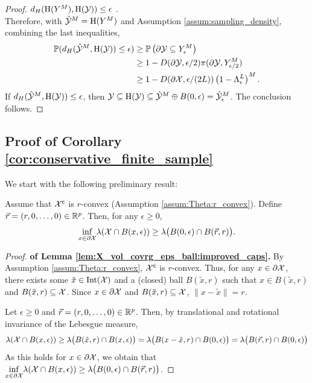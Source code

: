 \documentclass[12pt]{l4dc2022} %
\begin{document}
\begin{proof}
$d_H(
\textrm{H}(Y^M), 
\textrm{H}(\mathcal{Y})
)\leq \epsilon
$  
.
% 
\\
Therefore, with $\hat{\mathcal{Y}}^M=\textrm{H}(Y^M)$ and Assumption \ref{assum:sampling_density}, combining the last inequalities,
\begin{align*}
\mathbb{P}(
d_H(
\hat{\mathcal{Y}}^M, 
\textrm{H}(\mathcal{Y})
)\leq \epsilon
)
&\geq 
\mathbb{P}\left(\partial\mathcal{Y}\subseteq Y_\epsilon^M\right)
\\
&\geq 
1 - D(\partial\mathcal{Y},\epsilon/2)
\pi(\partial\mathcal{Y},Y_{\epsilon/2}^M)
\\
&\geq
1 - D(\partial\mathcal{X},\epsilon/(2L))
\left(1 -
	\Lambda_{\epsilon}^{L}
\right)^M.
\end{align*}
% 
% 
% 
% 
% 
% 
% 
% 
% 
% 
% 
% 
% 
% 
% 
% 
% 
% 
% 
% 
If $d_H(
\hat{\mathcal{Y}}^M, 
\textrm{H}(\mathcal{Y})
)\leq \epsilon$, 
then 
$\mathcal{Y}\subseteq\textrm{H}(\mathcal{Y})\subseteq \hat{\mathcal{Y}}^M\oplus B(0,\epsilon)=\hat{\mathcal{Y}}_\epsilon^M$. 
The conclusion follows.
\end{proof}



\subsection{Proof of Corollary \ref{cor:conservative_finite_sample}}\label{apdx:proof:cor:conservative_finite_sample}



We start with the following preliminary result:


% 
% 
% 
% 
% 
% 
% 
% 
% 
% 
\begin{lemma}%
\label{lem:X_vol_covrg_eps_ball:improved_caps}
Assume that $\mathcal{X}^{\mathsf{c}}$ is $r$-convex  (Assumption \ref{assum:Theta:r_convex}).
% 
Define 
$\vec{r}=(r,0,\dots,0)\in\mathbb{R}^p$. 
Then, for any $\epsilon\geq 0$,  
$$\underset{x\in\partial\mathcal{X}}{\inf}\lambda(\mathcal{X} \cap B(x,\epsilon))
\geq 
\lambda\big(
B(0,\epsilon) 
\cap B(\vec{r},r)
\big)
.$$
\end{lemma}



\begin{proof}\textbf{of Lemma \ref{lem:X_vol_covrg_eps_ball:improved_caps}.}
By Assumption \ref{assum:Theta:r_convex}, $\mathcal{X}^{\mathsf{c}}$ is $r$-convex. Thus, 
 for any $x\in\partial\mathcal{X}$, there exists some $\tilde{x}\in\textrm{Int}(\mathcal{X})$ and a (closed) ball $B(\tilde{x},r)$ such that $x\in B(\tilde{x},r)$ and $B(\tilde{x},r)\subseteq\mathcal{X}$. 
 Since $x\in\partial\mathcal{X}$ and $B(\tilde{x},r)\subseteq\mathcal{X}$, 
 $\|x-\tilde{x}\|=r$. %

Let $\epsilon\geq 0$ and $\vec{r}=(r,0,\dots,0)\in\mathbb{R}^p$. Then, by translational and rotational invariance of the Lebesgue measure,
$$
 \lambda(\mathcal{X} \cap B(x,\epsilon))
\geq 
\lambda\big(
B(\tilde{x},r) 
\cap 
B(x,\epsilon)
\big)
=
\lambda\big(
B(x-\tilde{x},r) 
\cap 
B(0,\epsilon)
\big)
=
\lambda\big(
B(\vec{r},r) 
\cap 
B(0,\epsilon)
\big)
$$
As this holds for $x\in\partial\mathcal{X}$, %
we obtain that 
$\underset{x\in\partial\mathcal{X}}{\inf}\lambda(\mathcal{X} \cap B(x,\epsilon))
\geq 
\lambda\big(
B(0,\epsilon) 
\cap B(\vec{r},r)
\big)
$.
\end{proof}
\end{document}
